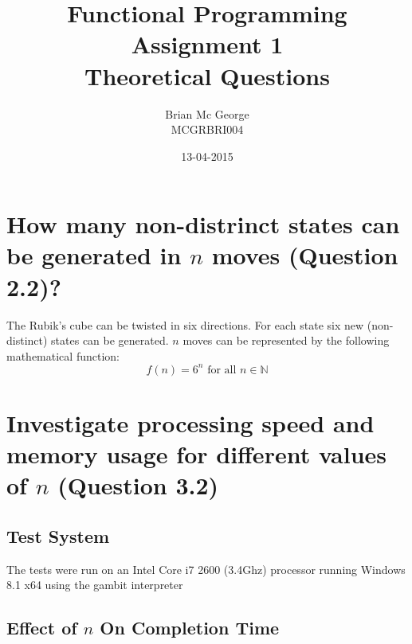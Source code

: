 \documentclass[]{article}
\title{Functional Programming Assignment 1\\Theoretical Questions}
\date{13-04-2015}
\author{Brian Mc George\\MCGRBRI004
}
\begin{document}
\maketitle
\newpage

\section{How many non-distrinct states can be generated in \(n\) moves (Question 2.2)?}
The Rubik's cube can be twisted in six directions. For each state six new (non-distinct) states can be generated. \(n\) moves can be represented by the following mathematical function:
\begin{equation}\label{func_states}	
	f(n)=6^n\text{ for all }n \in\mathbb{N}
\end{equation}

\section{Investigate processing speed and memory usage for different values of \(n\) (Question 3.2)}
\subsection{Test System}
The tests were run on an Intel Core i7 2600 (3.4Ghz) processor running Windows 8.1 x64 using the gambit interpreter

\subsection{Effect of \(n\) On Completion Time}
\end{document}

